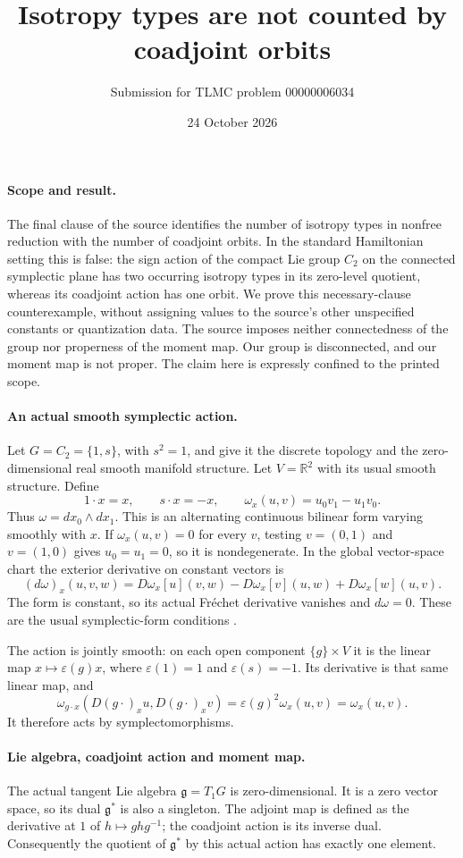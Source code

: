\documentclass[11pt,a4paper]{article}
\title{Isotropy types are not counted by coadjoint orbits}
\author{Submission for TLMC problem 00000006034}
\date{24 October 2026}
\newcommand{\R}{\mathbb R}
\newcommand{\g}{\mathfrak g}
\begin{document}
\maketitle

\paragraph{Scope and result.}
The final clause of the source identifies the number of isotropy types in
nonfree reduction with the number of coadjoint orbits. In the standard
Hamiltonian setting this is false: the sign action of the compact Lie
group $C_2$ on the connected symplectic plane has two occurring isotropy
types in its zero-level quotient, whereas its coadjoint action has one
orbit. We prove this necessary-clause counterexample, without assigning
values to the source's other unspecified constants or quantization data.
The source imposes neither connectedness of the group nor properness of
the moment map. Our group is disconnected, and our moment map is not
proper. The claim here is expressly confined to the printed scope.

\paragraph{An actual smooth symplectic action.}
Let $G=C_2=\{1,s\}$, with $s^2=1$, and give it the discrete topology and
the zero-dimensional real smooth manifold structure. Let $V=\R^2$ with
its usual smooth structure. Define
\[
  1\cdot x=x,\qquad s\cdot x=-x,\qquad
  \omega_x(u,v)=u_0v_1-u_1v_0.
\]
Thus $\omega=dx_0\wedge dx_1$. This is an alternating continuous
bilinear form varying smoothly with $x$. If $\omega_x(u,v)=0$ for every
$v$, testing $v=(0,1)$ and $v=(1,0)$ gives $u_0=u_1=0$, so it is
nondegenerate. In the global vector-space chart the exterior derivative
on constant vectors is
\[
 (d\omega)_x(u,v,w)=D\omega_x[u](v,w)
  -D\omega_x[v](u,w)+D\omega_x[w](u,v).
\]
The form is constant, so its actual Fr\'echet derivative vanishes and
$d\omega=0$. These are the usual symplectic-form conditions
\cite[\S1.3]{cannas}.

The action is jointly smooth: on each open component $\{g\}\times V$
it is the linear map $x\mapsto\varepsilon(g)x$, where
$\varepsilon(1)=1$ and $\varepsilon(s)=-1$. Its derivative is that same
linear map, and
\[
 \omega_{g\cdot x}(D(g\cdot)_x u,D(g\cdot)_x v)
  =\varepsilon(g)^2\omega_x(u,v)=\omega_x(u,v).
\]
It therefore acts by symplectomorphisms.

\paragraph{Lie algebra, coadjoint action and moment map.}
The actual tangent Lie algebra $\g=T_1G$ is zero-dimensional. It is a
zero vector space, so its dual $\g^*$ is also a singleton. The adjoint
map is defined as the derivative at $1$ of $h\mapsto ghg^{-1}$; the
coadjoint action is its inverse dual. Consequently the quotient of
$\g^*$ by this actual action has exactly one element.
\end{document}
